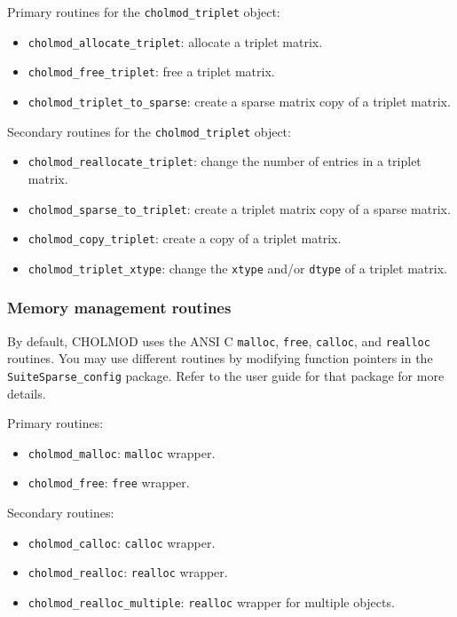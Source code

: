 \documentclass[11pt]{article}
\begin{document}
\vspace{0.1in}
\noindent Primary routines for the {\tt cholmod\_triplet} object:
    \begin{itemize}
    \item {\tt cholmod\_allocate\_triplet}: allocate a triplet matrix.
    \item {\tt cholmod\_free\_triplet}: free a triplet matrix.
    \item {\tt cholmod\_triplet\_to\_sparse}: create a sparse matrix copy of a
    triplet matrix.
    \end{itemize}

\noindent Secondary routines for the {\tt cholmod\_triplet} object:
    \begin{itemize}
    \item {\tt cholmod\_reallocate\_triplet}: change the number of entries in a
    triplet matrix.
    \item {\tt cholmod\_sparse\_to\_triplet}: create a triplet matrix copy of a
    sparse matrix.
    \item {\tt cholmod\_copy\_triplet}: create a copy of a triplet matrix.
    \item {\tt cholmod\_triplet\_xtype}: change the {\tt xtype} and/or
    {\tt dtype} of a triplet matrix.
    \end{itemize}

\subsubsection{Memory management routines}

By default, CHOLMOD uses the ANSI C {\tt malloc}, {\tt free},
{\tt calloc}, and {\tt realloc} routines.  You may use different
routines by modifying function pointers in the {\tt SuiteSparse\_config}
package.  Refer to the user guide for that package for more details.

\vspace{0.1in}
\noindent Primary routines:
    \begin{itemize}
    \item {\tt cholmod\_malloc}: {\tt malloc} wrapper.
    \item {\tt cholmod\_free}: {\tt free} wrapper.
    \end{itemize}

\noindent Secondary routines:
    \begin{itemize}
    \item {\tt cholmod\_calloc}: {\tt calloc} wrapper.
    \item {\tt cholmod\_realloc}: {\tt realloc} wrapper.
    \item {\tt cholmod\_realloc\_multiple}: {\tt realloc} wrapper for multiple
    objects.
    \end{itemize}
\end{document}
